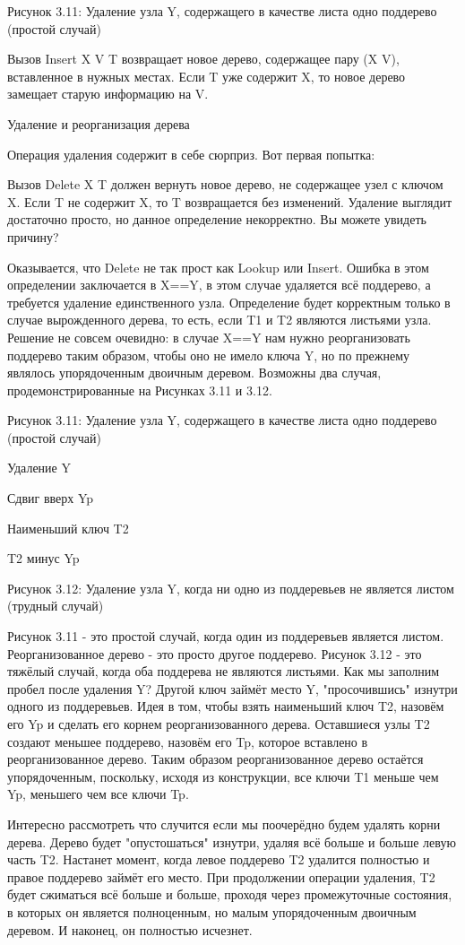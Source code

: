 Рисунок 3.11: Удаление узла Y, содержащего в качестве листа одно поддерево (простой случай)

Вызов {Insert X V T} возвращает новое дерево, содержащее пару (X V), вставленное в нужных местах. Если T уже содержит X, то новое дерево замещает старую информацию на V.

Удаление и реорганизация дерева

Операция удаления содержит в себе сюрприз. Вот первая попытка:

Вызов {Delete X T} должен вернуть новое дерево, не содержащее узел с ключом X. Если T не содержит X, то T возвращается без изменений. Удаление выглядит достаточно просто, но данное определение некорректно. Вы можете увидеть причину?

Оказывается, что Delete не так прост как Lookup или Insert. Ошибка в этом определении заключается в X==Y, в этом случае удаляется всё поддерево, а требуется удаление единственного узла. Определение будет корректным только в случае вырожденного дерева, то есть, если T1 и T2 являются листьями узла. Решение не совсем очевидно: в случае X==Y нам нужно реорганизовать поддерево таким образом, чтобы оно не имело ключа Y, но по прежнему являлось упорядоченным двоичным деревом. Возможны два случая, продемонстрированные на Рисунках 3.11 и 3.12.

Рисунок 3.11: Удаление узла Y, содержащего в качестве листа одно поддерево (простой случай)

Удаление Y

Сдвиг вверх Yp

Наименьший ключ T2

T2 минус Yp

Рисунок 3.12: Удаление узла Y, когда ни одно из поддеревьев не является листом (трудный случай)

Рисунок 3.11 - это простой случай, когда один из поддеревьев является листом. Реорганизованное дерево - это просто другое поддерево. Рисунок 3.12 - это тяжёлый случай, когда оба поддерева не являются листьями. Как мы заполним пробел после удаления Y? Другой ключ займёт место Y, "просочившись" изнутри одного из поддеревьев. Идея в том, чтобы взять наименьший ключ T2, назовём его Yp и сделать его корнем реорганизованного дерева. Оставшиеся узлы T2 создают меньшее поддерево, назовём его Tp, которое вставлено в реорганизованное дерево. Таким образом реорганизованное дерево остаётся упорядоченным, поскольку, исходя из конструкции, все ключи T1 меньше чем Yp, меньшего чем все ключи Tp.

Интересно рассмотреть что случится если мы поочерёдно будем удалять корни дерева. Дерево будет "опустошаться" изнутри, удаляя всё больше и больше левую часть T2. Настанет момент, когда левое поддерево T2 удалится полностью и правое поддерево займёт его место. При продолжении операции удаления, T2 будет сжиматься всё больше и больше, проходя через промежуточные состояния, в которых он является полноценным, но малым упорядоченным двоичным деревом. И наконец, он полностью исчезнет.

